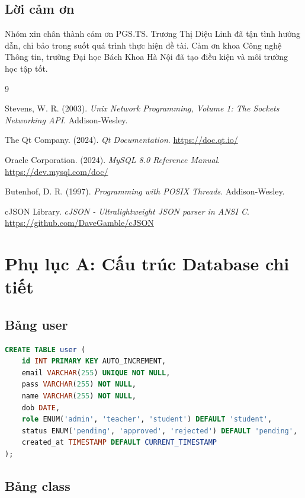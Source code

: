﻿\documentclass[12pt,a4paper]{report}
\begin{document}
\section{Lời cảm ơn}

Nhóm xin chân thành cảm ơn PGS.TS. Trương Thị Diệu Linh đã tận tình hướng dẫn, chỉ bảo trong suốt quá trình thực hiện đề tài. Cảm ơn khoa Công nghệ Thông tin, trường Đại học Bách Khoa Hà Nội đã tạo điều kiện và môi trường học tập tốt.

\begin{thebibliography}{9}

Stevens, W. R. (2003). \textit{Unix Network Programming, Volume 1: The Sockets Networking API}. Addison-Wesley.

The Qt Company. (2024). \textit{Qt Documentation}. \url{https://doc.qt.io/}

Oracle Corporation. (2024). \textit{MySQL 8.0 Reference Manual}. \url{https://dev.mysql.com/doc/}

Butenhof, D. R. (1997). \textit{Programming with POSIX Threads}. Addison-Wesley.

cJSON Library. \textit{cJSON - Ultralightweight JSON parser in ANSI C}. \url{https://github.com/DaveGamble/cJSON}

\end{thebibliography}

\appendix

\chapter{Phụ lục A: Cấu trúc Database chi tiết}

\section{Bảng user}

\begin{lstlisting}[language=SQL]
CREATE TABLE user (
    id INT PRIMARY KEY AUTO_INCREMENT,
    email VARCHAR(255) UNIQUE NOT NULL,
    pass VARCHAR(255) NOT NULL,
    name VARCHAR(255) NOT NULL,
    dob DATE,
    role ENUM('admin', 'teacher', 'student') DEFAULT 'student',
    status ENUM('pending', 'approved', 'rejected') DEFAULT 'pending',
    created_at TIMESTAMP DEFAULT CURRENT_TIMESTAMP
);
\end{lstlisting}

\section{Bảng class}
\end{document}
